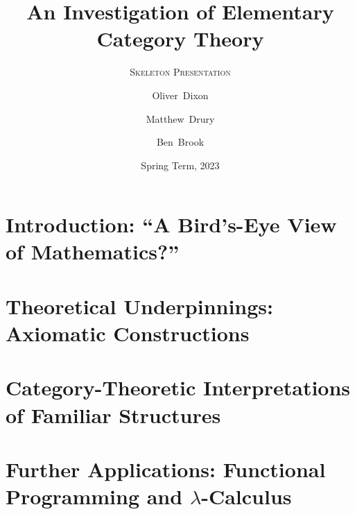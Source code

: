 \documentclass{beamer}
\title[Elementary Category Theory]%
{An Investigation of Elementary Category Theory}
\subtitle{\fontfamily{lmr}\textsc{Skeleton Presentation}}
\author[Dixon, Drury, Brook]%
{Oliver~Dixon \and Matthew~Drury \and Ben~Brook}
\institute[]{Department of Mathematics, University of York}
\date{Spring Term, 2023}
\begin{document}
\frame{\titlepage}
\section{Introduction: ``A Bird's-Eye View of Mathematics?''}
\section{Theoretical Underpinnings: Axiomatic Constructions}
\section{Category-Theoretic Interpretations of Familiar Structures}
\section{Further Applications: Functional Programming and %
        \texorpdfstring{$\lambda$}{Lambda}-Calculus}
\end{document}
